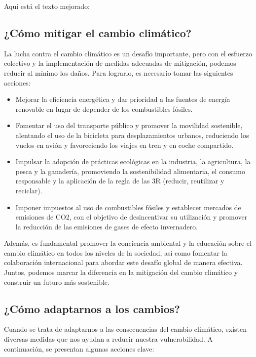 \documentclass[
  stu,
  floatsintext,
  longtable,
  a4paper,
  nolmodern,
  notxfonts,
  notimes,
  12pt,
  colorlinks=true,linkcolor=blue,citecolor=blue,urlcolor=blue]{apa7}
\begin{document}
Aquí está el texto mejorado:

\subsection{¿Cómo mitigar el cambio
climático?}\label{cuxf3mo-mitigar-el-cambio-climuxe1tico}

La lucha contra el cambio climático es un desafío importante, pero con
el esfuerzo colectivo y la implementación de medidas adecuadas de
mitigación, podemos reducir al mínimo los daños. Para lograrlo, es
necesario tomar las siguientes acciones:

\begin{itemize}
\item
  Mejorar la eficiencia energética y dar prioridad a las fuentes de
  energía renovable en lugar de depender de los combustibles fósiles.
\item
  Fomentar el uso del transporte público y promover la movilidad
  sostenible, alentando el uso de la bicicleta para desplazamientos
  urbanos, reduciendo los vuelos en avión y favoreciendo los viajes en
  tren y en coche compartido.
\item
  Impulsar la adopción de prácticas ecológicas en la industria, la
  agricultura, la pesca y la ganadería, promoviendo la sostenibilidad
  alimentaria, el consumo responsable y la aplicación de la regla de las
  3R (reducir, reutilizar y reciclar).
\item
  Imponer impuestos al uso de combustibles fósiles y establecer mercados
  de emisiones de CO2, con el objetivo de desincentivar su utilización y
  promover la reducción de las emisiones de gases de efecto invernadero.
\end{itemize}

Además, es fundamental promover la conciencia ambiental y la educación
sobre el cambio climático en todos los niveles de la sociedad, así como
fomentar la colaboración internacional para abordar este desafío global
de manera efectiva. Juntos, podemos marcar la diferencia en la
mitigación del cambio climático y construir un futuro más sostenible.

\subsection{¿Cómo adaptarnos a los
cambios?}\label{cuxf3mo-adaptarnos-a-los-cambios}

Cuando se trata de adaptarnos a las consecuencias del cambio climático,
existen diversas medidas que nos ayudan a reducir nuestra
vulnerabilidad. A continuación, se presentan algunas acciones clave:
\end{document}
